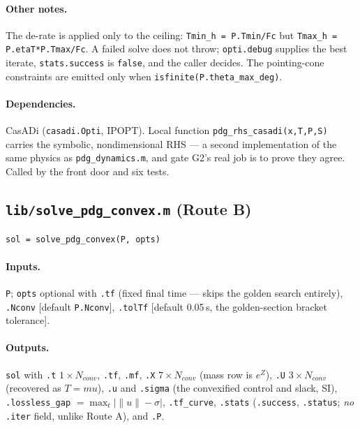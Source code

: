 \documentclass[11pt]{article}
\newcommand{\file}[1]{\texttt{#1}}
\begin{document}
\paragraph{Other notes.} The de-rate is applied only to the ceiling:
\texttt{Tmin\_h = P.Tmin/Fc} but \texttt{Tmax\_h = P.etaT*P.Tmax/Fc}. A
failed solve does not throw; \texttt{opti.debug} supplies the best iterate,
\texttt{stats.success} is \texttt{false}, and the caller decides. The
pointing-cone constraints are emitted only when
\texttt{isfinite(P.theta\_max\_deg)}.

\paragraph{Dependencies.} CasADi (\texttt{casadi.Opti}, IPOPT). Local
function \texttt{pdg\_rhs\_casadi(x,T,P,S)} carries the symbolic,
nondimensional RHS --- a second implementation of the same physics as
\file{pdg\_dynamics.m}, and gate G2's real job is to prove they agree.
Called by the front door and six tests.

\subsection{\texttt{lib/solve\_pdg\_convex.m} (Route B)}
\label{sec:mod:convex}

\begin{verbatim}
sol = solve_pdg_convex(P, opts)
\end{verbatim}

\paragraph{Inputs.} \texttt{P}; \texttt{opts} optional with \texttt{.tf}
(fixed final time --- skips the golden search entirely), \texttt{.Nconv}
[default \texttt{P.Nconv}], \texttt{.tolTf} [default 0.05\,s, the
golden-section bracket tolerance].

\paragraph{Outputs.} \texttt{sol} with \texttt{.t} $1\times N_{conv}$,
\texttt{.tf}, \texttt{.mf}, \texttt{.X} $7\times N_{conv}$ (mass row is
$e^{Z}$), \texttt{.U} $3\times N_{conv}$ (recovered as $T = mu$),
\texttt{.u} and \texttt{.sigma} (the convexified control and slack, SI),
\texttt{.lossless\_gap} $= \max_t\lvert\lVert u\rVert - \sigma\rvert$,
\texttt{.tf\_curve}, \texttt{.stats} (\texttt{.success}, \texttt{.status};
\emph{no} \texttt{.iter} field, unlike Route A), and \texttt{.P}.
\end{document}
